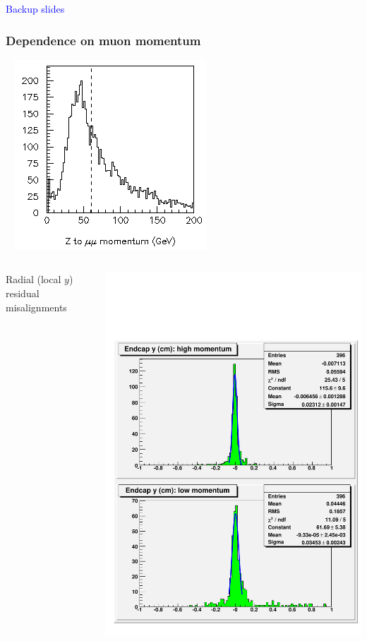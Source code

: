 \documentclass[compress]{beamer}
\begin{document}
\begin{frame}
\begin{center}
\Huge \textcolor{blue}{Backup slides}
\end{center}
\end{frame}

\begin{frame}
\frametitle{Dependence on muon momentum}

\vspace{-1 cm}
\mbox{ } \hfill \includegraphics[width=2 cm]{p_distribution.png}

\vspace{-1.3 cm}
\begin{columns}
\begin{minipage}{2\linewidth}
Radial (local $y$) residual misalignments
\end{minipage}

\vspace{0.1 cm}
\includegraphics[width=\linewidth]{momentum_endcap_y.pdf}


\end{columns}
\end{frame}
\end{document}
